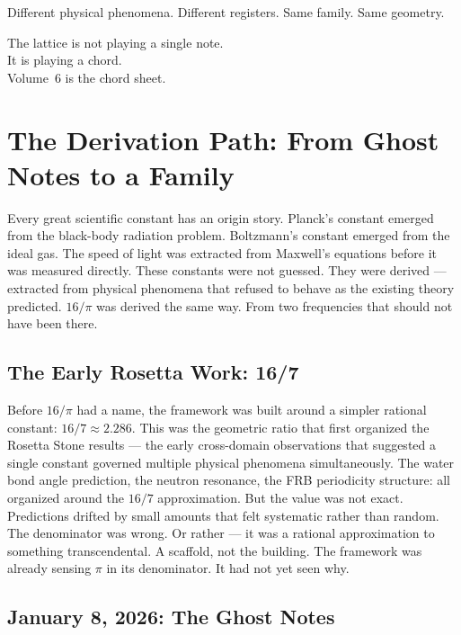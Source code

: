 \documentclass[11pt, letterpaper, openany]{book}
\begin{document}
Different physical phenomena.
Different registers. Same family. Same geometry.

The lattice is not playing a single note.\\
It is playing a chord.\\
Volume~6 is the chord sheet.

\tableofcontents
\clearpage

\chapter{The Derivation Path: From Ghost Notes to a Family}

Every great scientific constant has an origin story.
Planck's constant emerged from the black-body radiation problem. Boltzmann's constant emerged from the ideal gas.
The speed of light was extracted from Maxwell's equations before it was measured directly. These constants were not guessed.
They were derived --- extracted from physical phenomena that refused to behave as the existing theory predicted.
$16/\pi$ was derived the same way. From two frequencies that should not have been there.

\section*{The Early Rosetta Work: 16/7}

Before $16/\pi$ had a name, the framework was built around a simpler rational constant: $16/7 \approx 2.286$.
This was the geometric ratio that first organized the Rosetta Stone results --- the early cross-domain observations that suggested a single constant governed multiple physical phenomena simultaneously.
The water bond angle prediction, the neutron resonance, the FRB periodicity structure: all organized around the $16/7$ approximation.
But the value was not exact. Predictions drifted by small amounts that felt systematic rather than random. The denominator was wrong.
Or rather --- it was a rational approximation to something transcendental. A scaffold, not the building.
The framework was already sensing $\pi$ in its denominator. It had not yet seen why.

\section*{January 8, 2026: The Ghost Notes}
\end{document}
